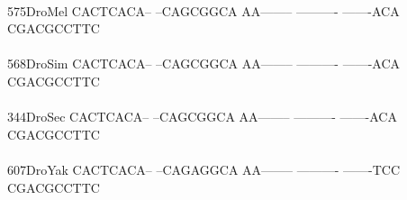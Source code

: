 \documentclass[11pt,twoside,reqno,a4paper]{article}
\begin{document}
{\\
575\hspace*{2\charwidth}DroMel	CACTCACA--	--CAGCGGCA	AA--------	----------	-------ACA	CGACGCCTTC	\\
\hspace*{5\charwidth}\hspace*{7\charwidth}\hspace*{1\charwidth}\hspace*{1\charwidth}\hspace*{1\charwidth}\hspace*{1\charwidth}\hspace*{1\charwidth}\hspace*{1\charwidth}\\
568\hspace*{2\charwidth}DroSim	CACTCACA--	--CAGCGGCA	AA--------	----------	-------ACA	CGACGCCTTC	\\
\hspace*{5\charwidth}\hspace*{7\charwidth}\hspace*{1\charwidth}\hspace*{1\charwidth}\hspace*{1\charwidth}\hspace*{1\charwidth}\hspace*{1\charwidth}\hspace*{1\charwidth}\\
344\hspace*{2\charwidth}DroSec	CACTCACA--	--CAGCGGCA	AA--------	----------	-------ACA	CGACGCCTTC	\\
\hspace*{5\charwidth}\hspace*{7\charwidth}\hspace*{1\charwidth}\hspace*{1\charwidth}\hspace*{1\charwidth}\hspace*{1\charwidth}\hspace*{1\charwidth}\hspace*{1\charwidth}\\
607\hspace*{2\charwidth}DroYak	CACTCACA--	--CAGAGGCA	AA--------	----------	-------TCC	CGACGCCTTC	\\
\hspace*{5\charwidth}\hspace*{7\charwidth}\hspace*{1\charwidth}\hspace*{1\charwidth}\hspace*{1\charwidth}\hspace*{1\charwidth}\hspace*{1\charwidth}\hspace*{1\charwidth}\\
}
\end{document}
